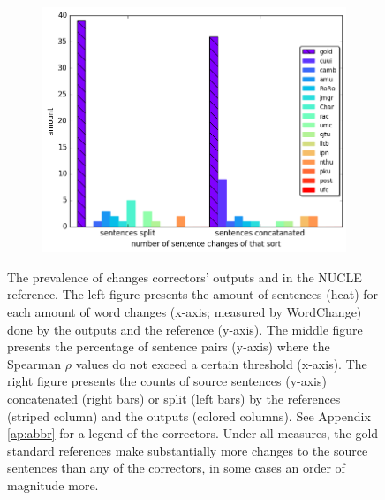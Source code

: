 \documentclass[letterpaper, 11pt]{article}
\begin{document}
\begin{figure}
\begin{subfigure}[]{0.6\columnwidth}
   	\includegraphics[width = \textwidth]{aligned}
  \end{subfigure}
  \caption{\label{fig:over-conservatism}
    The prevalence of changes correctors' outputs and in the NUCLE reference.
    The left figure presents the amount of sentences (heat) for each amount of word changes
    (x-axis; measured by {\sc WordChange}) done by the outputs and the reference (y-axis).
    The middle figure presents the percentage of sentence pairs (y-axis) where the
    Spearman $\rho$ values do not exceed a certain threshold (x-axis).
    The right figure presents the counts of source sentences (y-axis) concatenated (right bars) or split (left bars) by the references (striped column) and the outputs (colored columns).
    See Appendix \ref{ap:abbr} for a legend of the correctors.
    Under all measures, the gold standard references make substantially more changes to the source sentences than any of the correctors, in some cases an order of magnitude more.
  }
\vspace{-0.4cm}
\end{figure}
\end{document}
